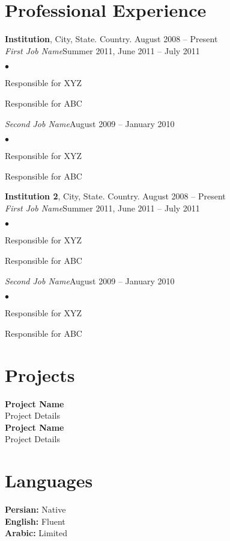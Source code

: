 \documentclass[margin,line]{res}
\newenvironment{list2}{
  \begin{list}{$\bullet$}{%
      \setlength{\itemsep}{0in}
      \setlength{\parsep}{0in} \setlength{\parskip}{0in}
      \setlength{\topsep}{0in} \setlength{\partopsep}{0in}
      \setlength{\leftmargin}{0.2in}}}{\end{list}}
\begin{document}
\begin{resume}
\section{\sc Professional Experience}
{\bf Institution}, City, State. Country. \hfill{August 2008 -- Present}\\
{\em First Job Name}\hfill {Summer 2011, June 2011 -- July 2011}\\
\begin{list2} %
\item Responsible for XYZ \\
\item Responsible for ABC\\
\end{list2}
{\em Second Job Name}\hfill {August 2009 -- January 2010}\\
\begin{list2} %
\item Responsible for XYZ \\
\item Responsible for ABC\\
\end{list2}
{\bf Institution 2}, City, State. Country. \hfill{August 2008 -- Present}\\
{\em First Job Name}\hfill {Summer 2011, June 2011 -- July 2011}\\
\begin{list2} %
\item Responsible for XYZ \\
\item Responsible for ABC\\
\end{list2}
{\em Second Job Name}\hfill {August 2009 -- January 2010}\\
\begin{list2} %
\item Responsible for XYZ \\
\item Responsible for ABC\\
\end{list2}
\section{\sc Projects}
{\bf Project Name}\\
Project Details\\

{\bf Project Name}\\
Project Details\\

\section{\sc Languages }
{\bf Persian:} Native \\
{\bf English:} Fluent \\ 
{\bf Arabic:} Limited \\

\end{resume}
\end{document}
